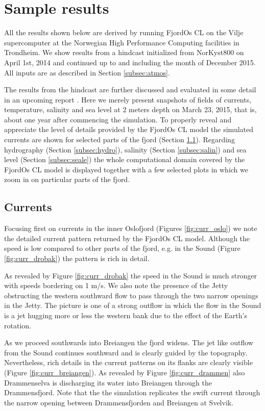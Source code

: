 \section{Sample results}
\label{sec:resul}
All the results shown below are derived by running FjordOs CL on the Vilje supercomputer at the Norwegian High Performance Computing facilities in Trondheim. We show results from a hindcast initialized from NorKyst800 on April 1st, 2014 and continued up to and including the month of December 2015. All inputs are as described in Section \ref{subsec:atmos}.
 
The results from the hindcast are further discussed and evaluated in some detail in an upcoming report \citep{hjelm:etal:2016}. Here we merely present snapshots of fields of currents, temperature, salinity and sea level at 2 meters depth on March 23, 2015, that is, about one year after commencing the simulation. To properly reveal and appreciate the level of details provided by the FjordOs CL model the simulated currents are shown for selected parts of the fjord (Section \ref{subsec:curre}). Regarding hydrography (Section \ref{subsec:hydro}), salinity (Section \ref{subsec:salin}) and sea level (Section \ref{subsec:seale}) the whole computational domain covered by the FjordOs CL model is displayed together with a few selected plots in which we zoom in on particular parts of the fjord. 

\subsection{Currents}
\label{subsec:curre}
Focusing first on currents in the inner Oslofjord (Figures \ref{fig:curr_oslo}) we note the detailed current pattern returned by the FjordOs CL model. Although the speed is low compared to other parts of the fjord, e.g. in the {\DR} Sound (Figure \ref{fig:curr_drobak}) the pattern is rich in detail. 
 

As revealed by Figure \ref{fig:curr_drobak} the speed in the {\DR} Sound is much stronger with speeds bordering on 1 m/s. We also note the presence of the Jetty obstructing the western southward flow to pass through the two narrow openings in the Jetty. The picture is one of a strong outflow in which the flow in the {\DR} Sound is a jet hugging more or less the western bank due to the effect of the Earth's rotation.   
 

As we proceed southwards into Breiangen the fjord widens. The jet like outflow from the {\DR} Sound continues southward and is clearly guided by the topography. Nevertheless, rich details in the current patterns on its flanks  are clearly visible (Figure \ref{fig:curr_breiangen}). As revealed by Figure \ref{fig:curr_drammen} also Drammenselva is discharging its water into Breiangen through the Drammensfjord. Note that the the simulation replicates the swift current through the narrow opening between Drammensfjorden and Breiangen at Svelvik.  
\clearpage
   
 

